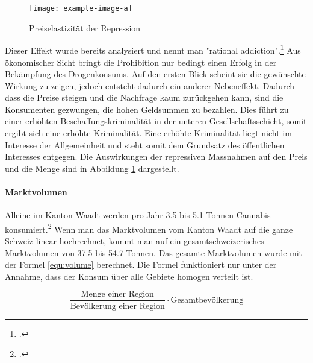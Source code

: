 \documentclass[../main.tex]{subfiles}
\begin{document}
	\noindent
	\begin{figure}[H]
		\centering
		\texttt{[image: example-image-a]}
		\captionsetup{font=small}
		\caption[Preiselastizität der Repression]{Preiselastizität der Repression\protect\footnotemark}		
		\label{fig:repression}
	\end{figure}
	
	
	\noindent
	Dieser Effekt wurde bereits analysiert und nennt man "rational addiction".\footcite{becker}
	Aus ökonomischer Sicht bringt die Prohibition nur bedingt einen Erfolg in der Bekämpfung des Drogenkonsums. 
	Auf den ersten Blick scheint sie die gewünschte Wirkung zu zeigen, jedoch entsteht dadurch ein anderer Nebeneffekt. 
	Dadurch dass die Preise steigen und die Nachfrage kaum zurückgehen kann, sind die Konsumenten gezwungen, die hohen Geldsummen zu bezahlen.
	Dies führt zu einer erhöhten Beschaffungskriminalität in der unteren Gesellschaftsschicht, somit ergibt sich eine erhöhte Kriminalität. 
	Eine erhöhte Kriminalität liegt nicht im Interesse der Allgemeinheit und steht somit dem Grundsatz des öffentlichen Interesses entgegen.
	Die Auswirkungen der repressiven Massnahmen auf den Preis und die Menge sind in Abbildung \ref{fig:repression} dargestellt.
	
	\paragraph{Marktvolumen}
	Alleine im Kanton Waadt werden pro Jahr 3.5 bis 5.1 Tonnen Cannabis konsumiert.\footcite{zobel} 	
	Wenn man das Marktvolumen vom Kanton Waadt auf die ganze Schweiz linear hochrechnet, kommt man auf ein gesamtschweizerisches Marktvolumen von 37.5 bis 54.7 Tonnen.
	Das gesamte Marktvolumen wurde mit der Formel \ref{equ:volume} berechnet.
	Die Formel funktioniert nur unter der Annahme, dass der Konsum über alle Gebiete homogen verteilt ist.
	
	\begin{equation}
		\frac{\text{Menge einer Region}}{\text{Bevölkerung einer Region}} \cdot \text{Gesamtbevölkerung}\label{equ:volume}
	\end{equation}\thinspace
	
\end{document}
